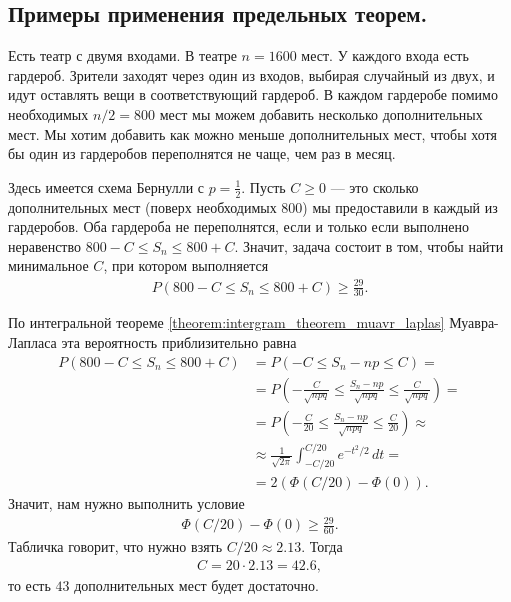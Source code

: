 \documentclass[../main.tex]{subfiles}
\begin{document}
\subsection{Примеры применения предельных теорем.}

\begin{exmpl}
 Есть театр с двумя входами. В театре $n=1600$ мест. У каждого входа есть гардероб. Зрители заходят через один из входов, выбирая случайный из двух, и идут оставлять вещи в соответствующий гардероб. В каждом гардеробе помимо необходимых $ n / 2 = 800 $ мест мы можем добавить несколько дополнительных мест. Мы хотим добавить как можно меньше дополнительных мест, чтобы хотя бы один из гардеробов переполнятся не чаще, чем раз в месяц. 

 Здесь имеется схема Бернулли с $p = \frac{1}{2}$. Пусть $C \geqslant 0$ --- это сколько дополнительных мест (поверх необходимых $800$) мы предоставили в каждый из гардеробов. Оба гардероба не переполнятся, если и только если выполнено неравенство $800 - C \leqslant S_n \leqslant 800 + C$. Значит, задача состоит в том, чтобы найти минимальное $ C $, при котором выполняется
 \begin{align*}
  P(800 - C \leqslant S_n \leqslant 800 + C) \geqslant \frac{29}{30}.
 \end{align*} 

 По интегральной теореме \ref{theorem:intergram_theorem_muavr_laplas} Муавра-Лапласа эта вероятность приблизительно равна
 \begin{align*}
  P(800 - C \leqslant S_n \leqslant 800 + C) &= P(-C \leqslant S_n - np \leqslant C) = \\
  &= P\left(-\frac{C}{\sqrt{npq}} \leqslant \frac{S_n - np}{\sqrt{npq}} \leqslant \frac{C}{\sqrt{npq}}\right) = \\
  &= P \left( -\frac{C}{20} \leqslant \frac{S_n - np}{\sqrt{npq}} \leqslant \frac{C}{20} \right) \approx \\
  &\approx \frac{1}{\sqrt{2\pi}} \int_{-C / 20}^{C / 20}  e^{-t^{2} / 2} \, dt = \\
  &= 2 (\Phi (C / 20) - \Phi(0))
 .\end{align*} Значит, нам нужно выполнить условие
 \begin{align*}
  \Phi(C/20) - \Phi(0)  \geqslant \frac{29}{60}
 .\end{align*} Табличка говорит, что нужно взять $C/20 \approx 2.13$. Тогда
 \begin{align*}
  C = 20 \cdot 2.13 = 42.6,
 \end{align*} то есть $ 43 $ дополнительных мест будет достаточно.
\end{exmpl}
\end{document}
